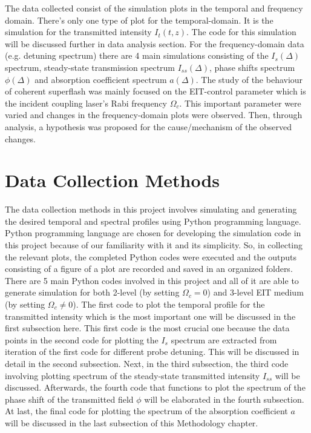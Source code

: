 The data collected consist of the simulation plots in the temporal and frequency domain. There's only one type of plot for the temporal-domain. It is the simulation for the transmitted intensity $I_{t}(t, z)$. The code for this simulation will be discussed further in data analysis section. For the frequency-domain data (e.g. detuning spectrum) there are 4 main simulations consisting of the $I_{s}(\Delta)$ spectrum, steady-state transmission spectrum $I_{ss}(\Delta)$, phase shifts spectrum $\phi(\Delta)$ and absorption coefficient spectrum $a(\Delta)$. The study of the behaviour of coherent superflash was mainly focused on the EIT-control parameter which is the incident coupling laser's Rabi frequency $\Omega_{c}$. This important parameter were varied and changes in the frequency-domain plots were observed. Then, through analysis, a hypothesis was proposed for the cause/mechanism of the observed changes.


\section{Data Collection Methods}
The data collection methods in this project involves simulating and generating the desired temporal and spectral profiles using Python programming language. Python programming language are chosen for developing the simulation code in this project because of our familiarity with it and its simplicity. So, in collecting the relevant plots, the completed Python codes were executed and the outputs consisting of a figure of a plot are recorded and saved in an organized folders. There are 5 main Python codes involved in this project and all of it are able to generate simulation for both 2-level (by setting $\Omega_{c} = 0$) and 3-level EIT medium (by setting $\Omega_{c} \neq 0$). The first code to plot the temporal profile for the transmitted intensity which is the most important one will be discussed in the first subsection here. This first code is the most crucial one because the data points in the second code for plotting the $I_{s}$ spectrum are extracted from iteration of the first code for different probe detuning. This will be discussed in detail in the second subsection. Next, in the third subsection, the third code involving plotting spectrum of the steady-state transmitted intensity $I_{ss}$ will be discussed. Afterwards, the fourth code that functions to plot the spectrum of the phase shift of the transmitted field $\phi$ will be elaborated in the fourth subsection. At last, the final code for plotting the spectrum of the absorption coefficient $a$ will be discussed in the last subsection of this Methodology chapter.

